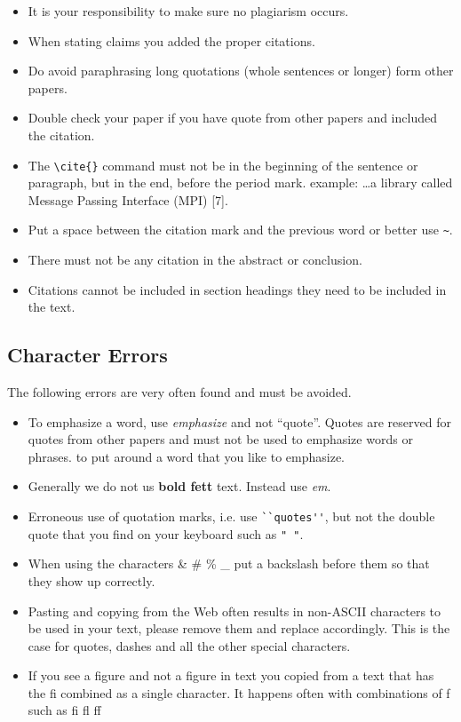 \begin{itemize}[label=$\Box$]
   \item It is your responsibility to make sure no plagiarism occurs. 
   \item When stating claims you added the proper citations. 
   \item Do avoid paraphrasing long quotations (whole sentences or
     longer) form other papers.
   \item Double check your paper if you have quote from other papers
     and included the citation.
   \item The \verb|\cite{}| command must not be in the beginning of
     the sentence or paragraph, but in the end, before the period
     mark. example: \ldots a library called Message Passing
     Interface (MPI) [7]. 
   \item Put a space between the citation mark and the previous word
     or better use  \verb|~|.
   \item There must not be any citation in the abstract or conclusion.
   \item Citations cannot be included in section headings they need to be
     included in the text. 
\end{itemize}

\subsection{Character Errors}

The following errors are very often found and must be avoided.

\begin{itemize}[label=$\Box$]
    \item To emphasize a word, use \textit{emphasize} and not
      ``quote''. Quotes are reserved for quotes from other papers and
      must not be used to emphasize words or phrases.
      to put around a word that you like to emphasize.
    \item Generally we do not us {\bf bold fett} text. Instead use
      \textit{em}.
    \item Erroneous use of quotation marks, i.e. use \verb|``quotes''|,
       but not the double quote that you find on your keyboard such as
       \verb|" "|.
    \item When using the characters \& \# \% \_ put a backslash before
      them so that they show up correctly.
    \item Pasting and copying from the Web often results in non-ASCII
      characters to be used in your text, please remove them and
      replace accordingly. This is the case for quotes, dashes and all
      the other special characters.
    \item If you see a f\hspace{-0.05cm}igure and not a figure in text
      you copied from a text that has the fi combined as a single
      character. It happens often with combinations of f such as fi fl
      ff
\end{itemize}

